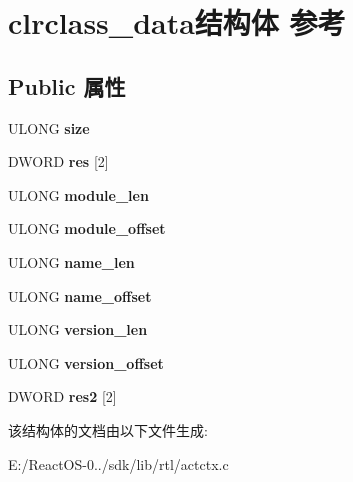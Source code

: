 \hypertarget{structclrclass__data}{}\section{clrclass\+\_\+data结构体 参考}
\label{structclrclass__data}
\subsection*{Public 属性}
\begin{DoxyCompactItemize}
\item 
\mbox{\label{structclrclass__data_a4494ce3e1d2aceafa37d28ec67ffc638}} 
U\+L\+O\+NG {\bfseries size}
\item 
\mbox{\label{structclrclass__data_a447ab92f3b3a3bffc3596a860d6da27a}} 
D\+W\+O\+RD {\bfseries res} \mbox{[}2\mbox{]}
\item 
\mbox{\label{structclrclass__data_a052bae98b0ed2b7a92d683e48877b21d}} 
U\+L\+O\+NG {\bfseries module\+\_\+len}
\item 
\mbox{\label{structclrclass__data_ab7fdae64fde1eb9d8464f94dc98b7c08}} 
U\+L\+O\+NG {\bfseries module\+\_\+offset}
\item 
\mbox{\label{structclrclass__data_ac05daf69a6dc55f88a2cb25246384c0e}} 
U\+L\+O\+NG {\bfseries name\+\_\+len}
\item 
\mbox{\label{structclrclass__data_a9f21d941d5e034a7194c5fe9bcd0dc17}} 
U\+L\+O\+NG {\bfseries name\+\_\+offset}
\item 
\mbox{\label{structclrclass__data_ac843c87f47a9776f64c405fa824bcaca}} 
U\+L\+O\+NG {\bfseries version\+\_\+len}
\item 
\mbox{\label{structclrclass__data_a64529a1093eb61774948e68276af587f}} 
U\+L\+O\+NG {\bfseries version\+\_\+offset}
\item 
\mbox{\label{structclrclass__data_a74dec29023a9429aa0cfafdf66c2b7d2}} 
D\+W\+O\+RD {\bfseries res2} \mbox{[}2\mbox{]}
\end{DoxyCompactItemize}


该结构体的文档由以下文件生成\+:\begin{DoxyCompactItemize}
\item 
E\+:/\+React\+O\+S-\/0../sdk/lib/rtl/actctx.\+c\end{DoxyCompactItemize}
